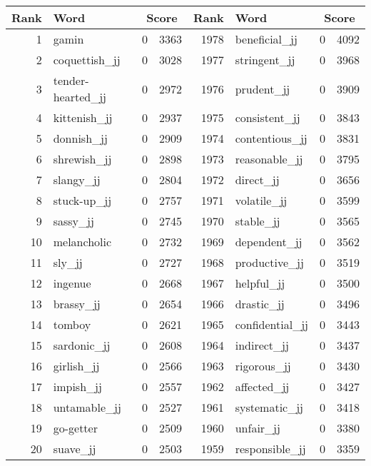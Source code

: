 \begin{table}[tbp]
    \begin{tabular}{| rlr@{.}l | rlr@{.}l |}
    \hline
    \textbf{Rank} & \textbf{Word} & \multicolumn{2}{c|}{\textbf{Score}} & \textbf{Rank} & \textbf{Word} & \multicolumn{2}{c|}{\textbf{Score}} \\
    \hline
    1 & gamin & 0 & 3363    &    1978 & beneficial\_jj & 0 & 4092 \\
    2 & coquettish\_jj & 0 & 3028    &    1977 & stringent\_jj & 0 & 3968 \\
    3 & tender-hearted\_jj & 0 & 2972    &    1976 & prudent\_jj & 0 & 3909 \\
    4 & kittenish\_jj & 0 & 2937    &    1975 & consistent\_jj & 0 & 3843 \\
    5 & donnish\_jj & 0 & 2909    &    1974 & contentious\_jj & 0 & 3831 \\
    6 & shrewish\_jj & 0 & 2898    &    1973 & reasonable\_jj & 0 & 3795 \\
    7 & slangy\_jj & 0 & 2804    &    1972 & direct\_jj & 0 & 3656 \\
    8 & stuck-up\_jj & 0 & 2757    &    1971 & volatile\_jj & 0 & 3599 \\
    9 & sassy\_jj & 0 & 2745    &    1970 & stable\_jj & 0 & 3565 \\
    10 & melancholic & 0 & 2732    &    1969 & dependent\_jj & 0 & 3562 \\
    11 & sly\_jj & 0 & 2727    &    1968 & productive\_jj & 0 & 3519 \\
    12 & ingenue & 0 & 2668    &    1967 & helpful\_jj & 0 & 3500 \\
    13 & brassy\_jj & 0 & 2654    &    1966 & drastic\_jj & 0 & 3496 \\
    14 & tomboy & 0 & 2621    &    1965 & confidential\_jj & 0 & 3443 \\
    15 & sardonic\_jj & 0 & 2608    &    1964 & indirect\_jj & 0 & 3437 \\
    16 & girlish\_jj & 0 & 2566    &    1963 & rigorous\_jj & 0 & 3430 \\
    17 & impish\_jj & 0 & 2557    &    1962 & affected\_jj & 0 & 3427 \\
    18 & untamable\_jj & 0 & 2527    &    1961 & systematic\_jj & 0 & 3418 \\
    19 & go-getter & 0 & 2509    &    1960 & unfair\_jj & 0 & 3380 \\
    20 & suave\_jj & 0 & 2503    &    1959 & responsible\_jj & 0 & 3359 \\

\end{tabular}
\end{table}
